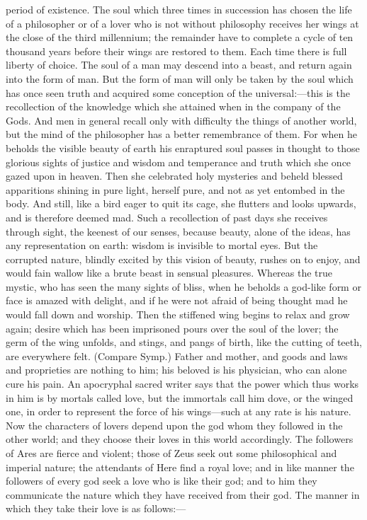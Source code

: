 \documentclass[11pt,letter]{article}
\begin{document}
period of existence. The soul which three times in succession has chosen the life of a philosopher or of a lover who is not without philosophy receives her wings at the close of the third millennium; the remainder have to complete a cycle of ten thousand years before their wings are restored to them. Each time there is full liberty of choice. The soul of a man may descend into a beast, and return again into the form of man. But the form of man will only be taken by the soul which has once seen truth and acquired some conception of the universal:—this is the recollection of the knowledge which she attained when in the company of the Gods. And men in general recall only with difficulty the things of another world, but the mind of the philosopher has a better remembrance of them. For when he beholds the visible beauty of earth his enraptured soul passes in thought to those glorious sights of justice and wisdom and temperance and truth which she once gazed upon in heaven. Then she celebrated holy mysteries and beheld blessed apparitions shining in pure light, herself pure, and not as yet entombed in the body. And still, like a bird eager to quit its cage, she flutters and looks upwards, and is therefore deemed mad. Such a recollection of past days she receives through sight, the keenest of our senses, because beauty, alone of the ideas, has any representation on earth: wisdom is invisible to mortal eyes. But the corrupted nature, blindly excited by this vision of beauty, rushes on to enjoy, and would fain wallow like a brute beast in sensual pleasures. Whereas the true mystic, who has seen the many sights of bliss, when he beholds a god-like form or face is amazed with delight, and if he were not afraid of being thought mad he would fall down and worship. Then the stiffened wing begins to relax and grow again; desire which has been imprisoned pours over the soul of the lover; the germ of the wing unfolds, and stings, and pangs of birth, like the cutting of teeth, are everywhere felt. (Compare Symp.) Father and mother, and goods and laws and proprieties are nothing to him; his beloved is his physician, who can alone cure his pain. An apocryphal sacred writer says that the power which thus works in him is by mortals called love, but the immortals call him dove, or the winged one, in order to represent the force of his wings—such at any rate is his nature. Now the characters of lovers depend upon the god whom they followed in the other world; and they choose their loves in this world accordingly. The followers of Ares are fierce and violent; those of Zeus seek out some philosophical and imperial nature; the attendants of Here find a royal love; and in like manner the followers of every god seek a love who is like their god; and to him they communicate the nature which they have received from their god. The manner in which they take their love is as follows:—
\end{document}
